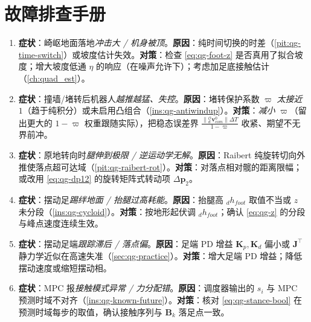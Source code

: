 \section*{故障排查手册}
\begin{enumerate}
  \item \textbf{症状}：崎岖地面落地\emph{冲击大 / 机身被顶}。\textbf{原因}：纯时间切换的时差（\cref{pit:qg-time-switch}）或坡度估计失效。\textbf{对策}：检查 \cref{eq:qg-foot-z} 是否真用了拟合坡度；增大坡度低通 $\eta$ 的响应（在噪声允许下）；考虑加足底接触估计（\cref{ch:quad_est}）。
  \item \textbf{症状}：撞墙/堵转后机器人\emph{越推越猛、失控}。\textbf{原因}：堵转保护系数 $\varpi$ \emph{太接近 $1$}（趋于纯积分）或未启用凸组合（\cref{ins:qg-antiwindup}）。\textbf{对策}：\emph{减小} $\varpi$（留出更大的 $1-\varpi$ 权重跟随实际），把稳态误差界 $\frac{\|{}_d^{\mathcal{O}}\boldsymbol{v}_{com}^{0}\|\Delta T}{1-\varpi}$ 收紧、期望不无界前冲。
  \item \textbf{症状}：原地转向时\emph{腿伸到极限 / 逆运动学无解}。\textbf{原因}：Raibert 纯旋转切向外推使落点超可达域（\cref{pit:qg-raibert-rot}）。\textbf{对策}：对落点相对髋的距离限幅；或改用 \cref{eq:qg-dp12} 的旋转矩阵式转动项 $\Delta\boldsymbol{p}_2$。
  \item \textbf{症状}：摆动足\emph{踢绊地面 / 抬腿过高耗能}。\textbf{原因}：抬腿高 ${}_dh_{foot}$ 取值不当或 $z$ 未分段（\cref{ins:qg-cycloid}）。\textbf{对策}：按地形起伏调 ${}_dh_{foot}$；确认 \cref{eq:qg-z} 的分段与峰点速度连续生效。
  \item \textbf{症状}：摆动足端\emph{跟踪滞后 / 落点偏}。\textbf{原因}：足端 PD 增益 $\boldsymbol{K}_p,\boldsymbol{K}_d$ 偏小或 $\mathbf{J}^\top$ 静力学近似在高速失准（\cref{sec:qg-practice}）。\textbf{对策}：增大足端 PD 增益；降低摆动速度或缩短摆动相。
  \item \textbf{症状}：MPC 报\emph{接触模式异常 / 力分配错}。\textbf{原因}：调度器输出的 $s_i$ 与 MPC 预测时域不对齐（\cref{ins:qg-known-future}）。\textbf{对策}：核对 \cref{eq:qg-stance-bool} 在预测时域每步的取值，确认接触序列与 $\mathbf{B}_k$ 落足点一致。
\end{enumerate}
